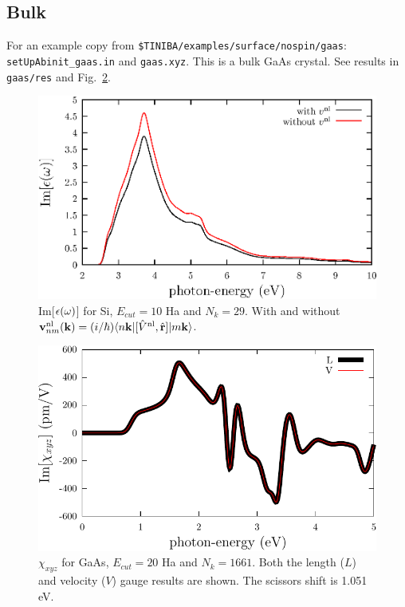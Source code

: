 \documentclass[12pt]{article}
\numberwithin{equation}{section}
\begin{document}
\subsection{Bulk} 
For an example copy from \verb=$TINIBA/examples/surface/nospin/gaas=:\\
\verb=setUpAbinit_gaas.in= and \verb=gaas.xyz=. This is a
bulk GaAs crystal. See results in \verb=gaas/res= and Fig.~\ref{shg-bulk}.
\begin{figure}[t]
\begin{center}
\includegraphics[scale=0.5]{plots/eps-bulk}
\end{center}
\caption{Im[$\epsilon(\omega)$] for Si, $E_{cut}=10$ Ha and $N_k=29$.
With and without $\mathbf{v}^{\mathrm{nl}}_{nm}(\mathbf{k})=(i/\hbar)\langle n\mathbf{k} |[\hat V^{\mathrm{nl}},\hat{\mathbf{r}}]| m\mathbf{k} \rangle$.
}
\label{si-bulk}
\end{figure}
\begin{figure}[t]
\begin{center}
\includegraphics[scale=0.5]{plots/shg-bulk}
\end{center}
\caption{$\chi_{xyz}$ for GaAs, $E_{cut}=20$ Ha and $N_k=1661$. Both
  the length ($L$) and velocity ($V$) gauge results are shown.
The scissors shift is 1.051 eV.
}
\label{shg-bulk}
\end{figure}
\end{document}

